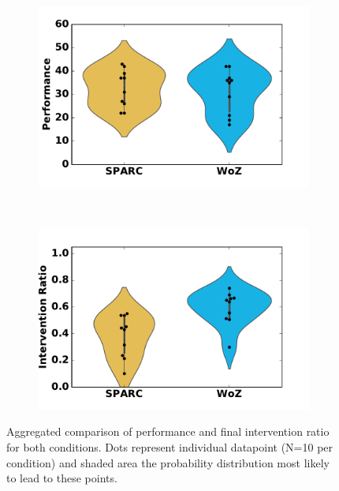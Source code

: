 \begin{figure}[ht]
	\centering
	\begin{subfigure}[ht]{0.5\textwidth}
		\centering
		\includegraphics[width=1.0\textwidth]{perf.pdf}
	\end{subfigure}%
	~ 
	\begin{subfigure}[ht]{0.5\textwidth}
		\centering
		\includegraphics[width=1.0\textwidth]{ratio.pdf}
	\end{subfigure}
	\caption{Aggregated comparison of performance and final intervention ratio for both conditions. Dots represent individual datapoint (N=10 per condition) and shaded area the probability distribution most likely to lead to these points.}
	\label{fig:woz_comp}
\end{figure}

